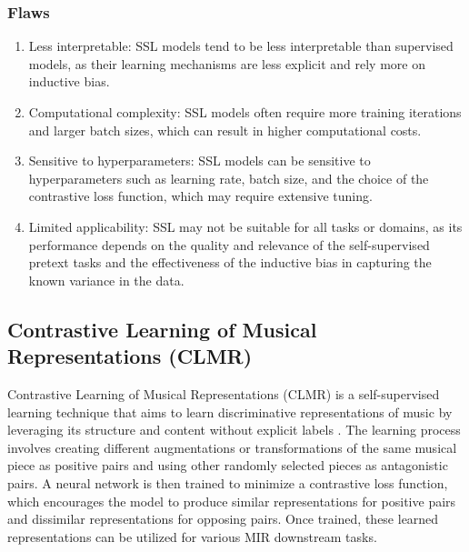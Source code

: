 \subsubsection{Flaws}

\begin{enumerate}
    \item Less interpretable: SSL models tend to be less interpretable than supervised models, as their learning mechanisms are less explicit and rely more on inductive bias.
    \item Computational complexity: SSL models often require more training iterations and larger batch sizes, which can result in higher computational costs.
    \item Sensitive to hyperparameters: SSL models can be sensitive to hyperparameters such as learning rate, batch size, and the choice of the contrastive loss function, which may require extensive tuning.
    \item Limited applicability: SSL may not be suitable for all tasks or domains, as its performance depends on the quality and relevance of the self-supervised pretext tasks and the effectiveness of the inductive bias in capturing the known variance in the data.
\end{enumerate} 

\subsection{Contrastive Learning of Musical Representations (CLMR)}

Contrastive Learning of Musical Representations (CLMR) is a self-supervised learning technique that aims to learn discriminative representations of music by leveraging its structure and content without explicit labels \cite{CLMR2021}\cite{multisourceclmr2023}. The learning process involves creating different augmentations or transformations of the same musical piece as positive pairs and using other randomly selected pieces as antagonistic pairs. A neural network is then trained to minimize a contrastive loss function, which encourages the model to produce similar representations for positive pairs and dissimilar representations for opposing pairs. Once trained, these learned representations can be utilized for various MIR downstream tasks.

\section{}

